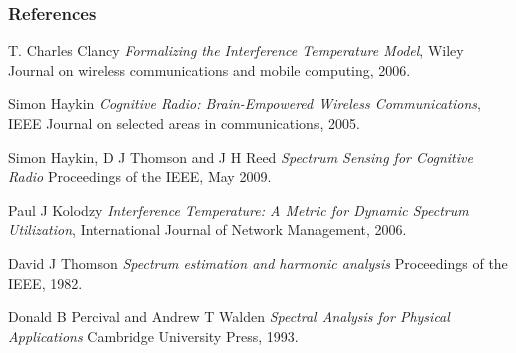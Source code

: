 \documentclass[mathserif]{beamer}
\begin{document}
\begin{frame}[allowframebreaks]
	\frametitle<presentation>{References}
\begin{thebibliography}{10}

    T. Charles Clancy
    \newblock \emph{Formalizing the Interference Temperature Model},
    \newblock Wiley Journal on wireless communications and mobile computing, 2006.

    Simon Haykin
    \newblock  \emph{Cognitive Radio: Brain-Empowered Wireless Communications},
    \newblock IEEE Journal on selected areas in communications, 2005.

    Simon Haykin, D J Thomson and J H Reed
    \newblock \emph{Spectrum Sensing for Cognitive Radio}
    \newblock Proceedings of the IEEE, May 2009.

    Paul J Kolodzy
    \newblock \emph{Interference Temperature: A Metric for Dynamic Spectrum Utilization},
    \newblock International Journal of Network Management, 2006.

    David J Thomson
    \newblock \emph{Spectrum estimation and harmonic analysis}
    \newblock Proceedings of the IEEE, 1982.

    Donald B Percival and Andrew T Walden
    \newblock \emph{Spectral Analysis for Physical Applications}
    \newblock Cambridge University Press, 1993.

\end{thebibliography}

\end{frame}
\end{document}
